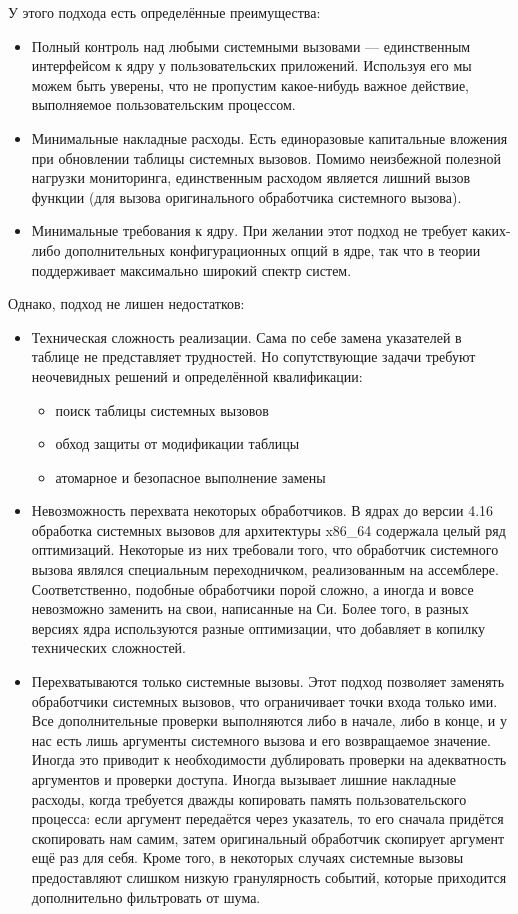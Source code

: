 	У этого подхода есть определённые преимущества:
	\begin{itemize}
		\item Полный контроль над любыми системными вызовами — единственным интерфейсом к ядру у пользовательских приложений. Используя его мы можем быть уверены, что не пропустим какое-нибудь важное действие, выполняемое пользовательским процессом.
		\item Минимальные накладные расходы. Есть единоразовые капитальные вложения при обновлении таблицы системных вызовов. Помимо неизбежной полезной нагрузки мониторинга, единственным расходом является лишний вызов функции (для вызова оригинального обработчика системного вызова).
		\item Минимальные требования к ядру. При желании этот подход не требует каких-либо дополнительных конфигурационных опций в ядре, так что в теории поддерживает максимально широкий спектр систем.
	\end{itemize}
	
	Однако, подход не лишен недостатков:
	\begin{itemize}
		\item Техническая сложность реализации. Сама по себе замена указателей в таблице не представляет трудностей. Но сопутствующие задачи требуют неочевидных решений и определённой квалификации:
		\begin{itemize}
			\item поиск таблицы системных вызовов
			\item обход защиты от модификации таблицы
			\item атомарное и безопасное выполнение замены
		\end{itemize}
		\item Невозможность перехвата некоторых обработчиков. В ядрах до версии 4.16 обработка системных вызовов для архитектуры x86\_64 содержала целый ряд оптимизаций. Некоторые из них требовали того, что обработчик системного вызова являлся специальным переходничком, реализованным на ассемблере. Соответственно, подобные обработчики порой сложно, а иногда и вовсе невозможно заменить на свои, написанные на Си. Более того, в разных версиях ядра используются разные оптимизации, что добавляет в копилку технических сложностей.
		\item Перехватываются только системные вызовы. Этот подход позволяет заменять обработчики системных вызовов, что ограничивает точки входа только ими. Все дополнительные проверки выполняются либо в начале, либо в конце, и у нас есть лишь аргументы системного вызова и его возвращаемое значение. Иногда это приводит к необходимости дублировать проверки на адекватность аргументов и проверки доступа. Иногда вызывает лишние накладные расходы, когда требуется дважды копировать память пользовательского процесса: если аргумент передаётся через указатель, то его сначала придётся скопировать нам самим, затем оригинальный обработчик скопирует аргумент ещё раз для себя. Кроме того, в некоторых случаях системные вызовы предоставляют слишком низкую гранулярность событий, которые приходится дополнительно фильтровать от шума.
	\end{itemize}
	
